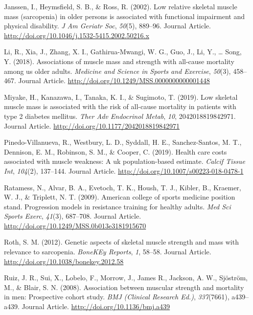 \documentclass[twoside,10pt]{gihclass} %
\begin{document}
\leavevmode\hypertarget{ref-RN2517}{}%
Janssen, I., Heymsfield, S. B., \& Ross, R. (2002). Low relative skeletal muscle mass (sarcopenia) in older persons is associated with functional impairment and physical disability. \emph{J Am Geriatr Soc}, \emph{50}(5), 889--96. Journal Article. \url{http://doi.org/10.1046/j.1532-5415.2002.50216.x}

\leavevmode\hypertarget{ref-RN2512}{}%
Li, R., Xia, J., Zhang, X. I., Gathirua-Mwangi, W. G., Guo, J., Li, Y., \ldots{} Song, Y. (2018). Associations of muscle mass and strength with all-cause mortality among us older adults. \emph{Medicine and Science in Sports and Exercise}, \emph{50}(3), 458--467. Journal Article. \url{http://doi.org/10.1249/MSS.0000000000001448}

\leavevmode\hypertarget{ref-RN2514}{}%
Miyake, H., Kanazawa, I., Tanaka, K. I., \& Sugimoto, T. (2019). Low skeletal muscle mass is associated with the risk of all-cause mortality in patients with type 2 diabetes mellitus. \emph{Ther Adv Endocrinol Metab}, \emph{10}, 2042018819842971. Journal Article. \url{http://doi.org/10.1177/2042018819842971}

\leavevmode\hypertarget{ref-RN2184}{}%
Pinedo-Villanueva, R., Westbury, L. D., Syddall, H. E., Sanchez-Santos, M. T., Dennison, E. M., Robinson, S. M., \& Cooper, C. (2019). Health care costs associated with muscle weakness: A uk population-based estimate. \emph{Calcif Tissue Int}, \emph{104}(2), 137--144. Journal Article. \url{http://doi.org/10.1007/s00223-018-0478-1}

\leavevmode\hypertarget{ref-RN1}{}%
Ratamess, N., Alvar, B. A., Evetoch, T. K., Housh, T. J., Kibler, B., Kraemer, W. J., \& Triplett, N. T. (2009). American college of sports medicine position stand. Progression models in resistance training for healthy adults. \emph{Med Sci Sports Exerc}, \emph{41}(3), 687--708. Journal Article. \url{http://doi.org/10.1249/MSS.0b013e3181915670}

\leavevmode\hypertarget{ref-RN2527}{}%
Roth, S. M. (2012). Genetic aspects of skeletal muscle strength and mass with relevance to sarcopenia. \emph{BoneKEy Reports}, \emph{1}, 58--58. Journal Article. \url{http://doi.org/10.1038/bonekey.2012.58}

\leavevmode\hypertarget{ref-RN2376}{}%
Ruiz, J. R., Sui, X., Lobelo, F., Morrow, J., James R., Jackson, A. W., Sjöström, M., \& Blair, S. N. (2008). Association between muscular strength and mortality in men: Prospective cohort study. \emph{BMJ (Clinical Research Ed.)}, \emph{337}(7661), a439--a439. Journal Article. \url{http://doi.org/10.1136/bmj.a439}
\end{document}
